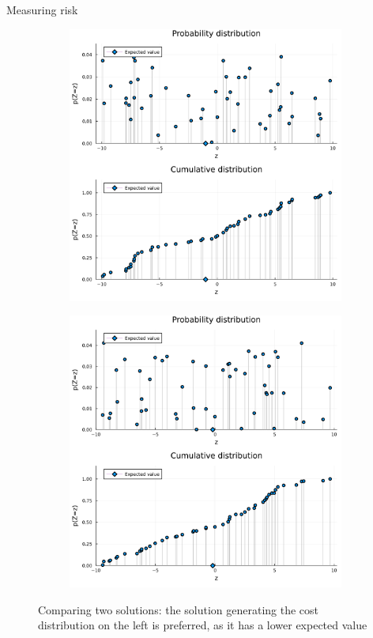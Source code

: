 \begin{frame}{Measuring risk}
	\begin{figure}
	\centering
	\begin{subfigure}{.5\textwidth}
	  \centering
	  \includegraphics[width=\linewidth]{figures/distributions_1.pdf}
	  \label{fig:sub1}
	\end{subfigure}%
	\begin{subfigure}{.5\textwidth}
	  \centering
	  \includegraphics[width=\linewidth]{figures/distributions_10.pdf}
	  \label{fig:sub2}
	\end{subfigure}
	\caption{Comparing two solutions: the solution generating the cost distribution on the left is preferred, as it has a lower expected value}
	\label{fig:test}
	\end{figure}
\end{frame}


